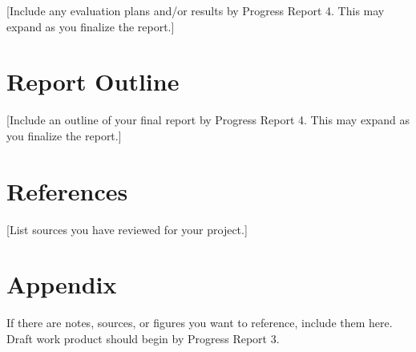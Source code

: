 \documentclass[12pt]{article}
\begin{document}
[Include any evaluation plans and/or results by Progress Report 4. This may
expand as you finalize the report.]

\section{Report Outline}

[Include an outline of your final report by Progress Report 4. This may
expand as you finalize the report.]

\section{References}

[List sources you have reviewed for your project.]

\newpage
\section{Appendix}

If there are notes, sources, or figures you want to reference, include them
here. Draft work product should begin by Progress Report 3.
\end{document}
